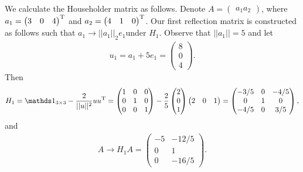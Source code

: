 We calculate the Householder matrix as follows.
Denote $A = \begin{pmatrix} a_1 a_2 \end{pmatrix}$, where $a_1 = \begin{pmatrix} 3 & 0 & 4 \end{pmatrix}^{\rm T}$ and $a_2 = \begin{pmatrix} 4 & 1 & 0 \end{pmatrix}^{\rm T}$.
Our first reflection matrix is constructed as follows such that $a_1 \rightarrow ||a_1||_{2} e_1$under $H_1$.
Observe that $||a_1|| = 5$ and let 
\begin{eqnarray}
    \label{eq:u1}
    u_1 = a_1 + 5e_1 = \begin{pmatrix}
    8 \\ 0 \\ 4
    \end{pmatrix}
.\end{eqnarray}
Then
\begin{eqnarray}
    \label{eq:H1}
    H_1 = \id_{3 \times 3} - \frac{2}{||u||^2} u u^{\rm T} = \begin{pmatrix}
    1 & 0 & 0 \\
    0 & 1 & 0 \\
    0 & 0 & 1
    \end{pmatrix}
    - \frac{2}{5}\begin{pmatrix}
    2 \\ 0 \\ 1 
    \end{pmatrix}
    \begin{pmatrix}
    2 & 0 & 1   
    \end{pmatrix}
    = \begin{pmatrix}
        -3/5 & 0 & -4/5 \\
        0 & 1 & 0 \\
        -4/5 & 0 & 3/5
    \end{pmatrix}
,\end{eqnarray}
and
\begin{eqnarray}
    \label{eq:A-after-ref1}
    A \rightarrow H_1 A = \begin{pmatrix}
        -5 & -12/5 \\
        0 & 1 \\
        0 & -16/5
    \end{pmatrix}
.\end{eqnarray}

